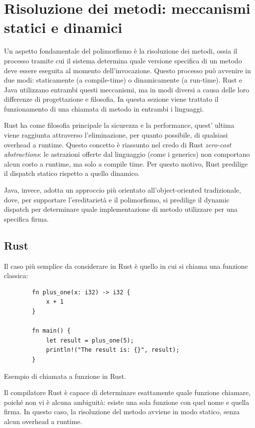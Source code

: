 \section{Risoluzione dei metodi: meccanismi statici e dinamici}
Un aspetto fondamentale del polimorfismo è la risoluzione dei metodi, ossia il processo tramite cui il sistema determina quale versione specifica di un metodo deve essere eseguita al momento dell'invocazione. Questo processo può avvenire in due modi: staticamente (a compile-time) o dinamicamente (a run-time). Rust e Java utilizzano entrambi questi meccanismi, ma in modi diversi a causa delle loro differenze di progettazione e filosofia. In questa sezione viene trattato il funzionamento di una chiamata di metodo in entrambi i linguaggi.

Rust ha come filosofia principale la sicurezza e la performance, quest' ultima viene raggiunta attraverso l'eliminazione, per quanto possibile, di qualsiasi overhead a runtime. Questo concetto è riassunto nel credo di Rust \textit{zero-cost abstractions}: le astrazioni offerte dal linguaggio (come i generics) non comportano alcun costo a runtime, ma solo a compile time. Per questo motivo, Rust predilige il dispatch statico rispetto a quello dinamico. 

Java, invece, adotta un approccio più orientato all'object-oriented tradizionale, dove, per supportare l'ereditarietà e il polimorfismo, si predilige il dynamic dispatch per determinare quale implementazione di metodo utilizzare per una specifica firma. 
\subsection{Rust}
Il caso più semplice da considerare in Rust è quello in cui si chiama una funzione classica:
\begin{listing}[H]
    \begin{verbatim}
        fn plus_one(x: i32) -> i32 {
            x + 1
        }

        fn main() {
            let result = plus_one(5);
            println!("The result is: {}", result);
        }
    \end{verbatim}
    \caption{Esempio di chiamata a funzione in Rust.}
    \label{lst:rust_function_call}
\end{listing}
Il compilatore Rust è capace di determinare esattamente quale funzione chiamare, poiché non vi è alcuna ambiguità: esiste una sola funzione con quel nome e quella firma. In questo caso, la risoluzione del metodo avviene in modo statico, senza alcun overhead a runtime.

